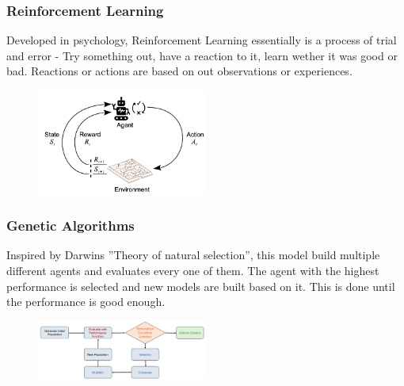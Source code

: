 \documentclass[
../../EiKI_Summary.tex,
]
{subfiles}
\begin{document}
\subsubsection{Reinforcement Learning}
Developed in psychology, Reinforcement Learning essentially is a process of trial and error - Try something out, have a reaction to it, learn wether it was good or bad. Reactions or actions are based on out observations or experiences.

\begin{figure}
    [htp]
    \centering
    \includegraphics[width=0.5\textwidth]{Pics/02/ReinforcementLearningLoop.png}
\end{figure}

\newpage
\subsubsection{Genetic Algorithms}
Inspired by Darwins ''Theory of natural selection'', this model build multiple different agents and evaluates every one of them. The agent with the highest performance is selected and new models are built based on it. This is done until the performance is good enough.

\begin{figure}
    [htp]
    \centering
    \includegraphics[width=0.5\textwidth]{Pics/02/GeneticAlgorithms.png}
\end{figure}
\end{document}
